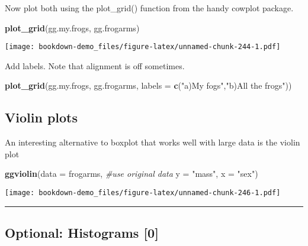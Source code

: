 \documentclass[]{book}
\newenvironment{Shaded}{\begin{snugshade}}{\end{snugshade}}
\newcommand{\KeywordTok}[1]{\textcolor[rgb]{0.13,0.29,0.53}{\textbf{#1}}}
\newcommand{\DataTypeTok}[1]{\textcolor[rgb]{0.13,0.29,0.53}{#1}}
\newcommand{\StringTok}[1]{\textcolor[rgb]{0.31,0.60,0.02}{#1}}
\newcommand{\CommentTok}[1]{\textcolor[rgb]{0.56,0.35,0.01}{\textit{#1}}}
\newcommand{\NormalTok}[1]{#1}
\theoremstyle{definition}
\theoremstyle{definition}
\theoremstyle{definition}
\theoremstyle{remark}
\begin{document}
Now plot both using the plot\_grid() function from the handy cowplot
package.

\begin{Shaded}
\begin{Highlighting}[]
\KeywordTok{plot_grid}\NormalTok{(gg.my.frogs,}
\NormalTok{          gg.frogarms)}
\end{Highlighting}
\end{Shaded}

\texttt{[image: bookdown-demo\_files/figure-latex/unnamed-chunk-244-1.pdf]}

Add labels. Note that alignment is off sometimes.

\begin{Shaded}
\begin{Highlighting}[]
\KeywordTok{plot_grid}\NormalTok{(gg.my.frogs, }
\NormalTok{          gg.frogarms,}
          \DataTypeTok{labels =} \KeywordTok{c}\NormalTok{(}\StringTok{"a)My fogs"}\NormalTok{,}\StringTok{"b)All the frogs"}\NormalTok{))}
\end{Highlighting}
\end{Shaded}

\subsection{Violin plots}\label{violin-plots}

An interesting alternative to boxplot that works well with large data is
the violin plot

\begin{Shaded}
\begin{Highlighting}[]
\KeywordTok{ggviolin}\NormalTok{(}\DataTypeTok{data =}\NormalTok{ frogarms, }\CommentTok{#use original data}
          \DataTypeTok{y =} \StringTok{"mass"}\NormalTok{,}
          \DataTypeTok{x =} \StringTok{"sex"}\NormalTok{)}
\end{Highlighting}
\end{Shaded}

\texttt{[image: bookdown-demo\_files/figure-latex/unnamed-chunk-246-1.pdf]}

\begin{center}\rule{0.5\linewidth}{\linethickness}\end{center}

\subsection{Optional: Histograms {[}0{]}}\label{optional-histograms-0}
\end{document}
